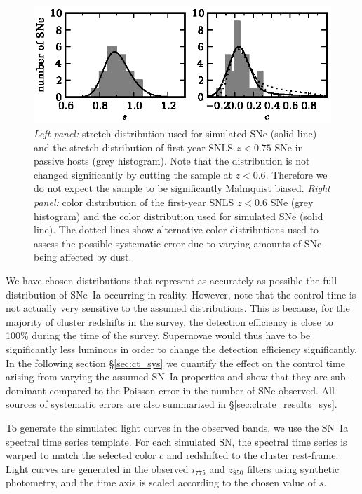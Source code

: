 \begin{figure}[tbhp]

\includegraphics[width=\textwidth]{figures/clrate/dists_cluster.eps}
\caption[Stretch and color distributions of simulated supernovae]
{{\it Left panel:} stretch distribution used for simulated SNe 
(solid line) and the stretch distribution of first-year SNLS
$z<0.75$ SNe in passive hosts \citep{sullivan06a} (grey
histogram). Note that the distribution is not changed significantly
by cutting the sample at $z<0.6$. Therefore we do not expect the
sample to be significantly Malmquist biased. {\it Right panel:} color
distribution of the first-year SNLS $z<0.6$ SNe \citep{astier06a}
(grey histogram) and the color distribution used for simulated
SNe (solid line). The dotted lines show alternative
color distributions used to assess the possible systematic error due
to varying amounts of SNe being affected by dust.\label{fig:dists}}
\end{figure}

We have chosen distributions that represent as accurately as possible
the full distribution of SNe~Ia occurring in reality. However, note
that the control time is not actually very sensitive to the assumed
distributions. This is because, for the majority of cluster redshifts
in the survey, the detection efficiency is close to 100\% during the
time of the survey. Supernovae would thus have to be significantly
less luminous in order to change the detection efficiency
significantly. In the following section \S\ref{sec:ct_sys} we quantify the
effect on the control time arising from varying the assumed SN~Ia
properties and show that they are sub-dominant compared to the Poisson
error in the number of SNe observed. All sources of systematic errors
are also summarized in \S\ref{sec:clrate_results_sys}.

To generate the simulated light curves in the observed bands, we use
the \citet{hsiao07a} SN~Ia spectral time series template. For each
simulated SN, the spectral time series is warped to match the selected
color $c$ and redshifted to the cluster rest-frame. Light curves are
generated in the observed $i_{775}$ and $z_{850}$ filters using
synthetic photometry, and the time axis is scaled according to the
chosen value of $s$.

